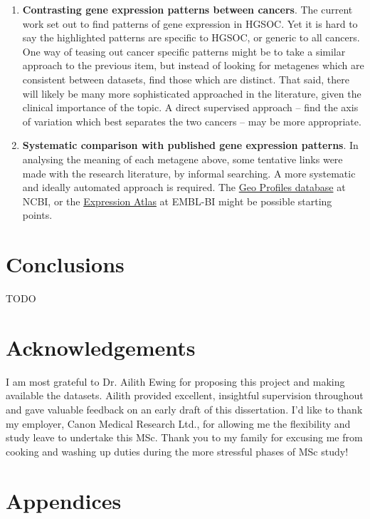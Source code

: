\documentclass[tikz, 12pt,a4paper,oneside,fleqn]{article}
\begin{document}
\begin{enumerate}
\item
{\bf Contrasting gene expression patterns between cancers}.  The current work set out to find patterns of gene expression in HGSOC.  Yet it is hard to say the highlighted patterns are specific to HGSOC, or generic to all cancers.  One way of teasing out cancer specific patterns might be to take a similar approach to the previous item, but instead of looking for metagenes which are consistent between datasets, find those which are distinct.  That said, there will likely be many more sophisticated approached in the literature, given the clinical importance of the topic.  A direct supervised approach -- find the axis of variation which best separates the two cancers -- may be more appropriate.
\item
{\bf Systematic comparison with published gene expression patterns}.  In analysing the meaning of each metagene above, some tentative links were made with the research literature, by informal searching.   A more systematic and ideally automated approach is required.  The \href{https://www.ncbi.nlm.nih.gov/geoprofiles}{Geo Profiles database} at NCBI, or the \href{https://www.ebi.ac.uk/gxa/home}{Expression Atlas} at EMBL-BI might be possible starting points.

\end{enumerate}

\FloatBarrier

\section{Conclusions}
TODO

\section*{Acknowledgements}
I am most grateful to Dr. Ailith Ewing for proposing this project and making available the datasets.  Ailith provided excellent, insightful supervision throughout and gave valuable feedback on an early draft of this dissertation.  I'd like to thank my employer, Canon Medical Research Ltd., for allowing me the flexibility and study leave to undertake this MSc.  Thank you to my family for excusing me from cooking and washing up duties during the more stressful phases of MSc study!

\small



\section{Appendices}
\end{document}
